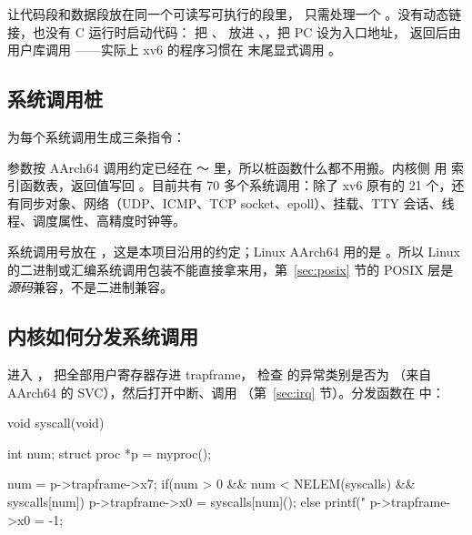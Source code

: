  让代码段和数据段放在同一个可读写可执行的段里， 只需处理一个 。没有动态链接，也没有 C 运行时启动代码： 把 、 放进 、，把 PC 设为入口地址， 返回后由用户库调用 ——实际上 xv6 的程序习惯在  末尾显式调用 。

\subsection{系统调用桩}

 为每个系统调用生成三条指令：


参数按 AArch64 调用约定已经在 ～ 里，所以桩函数什么都不用搬。内核侧  用  索引函数表，返回值写回 。目前共有 70 多个系统调用：除了 xv6 原有的 21 个，还有同步对象、网络（UDP、ICMP、TCP socket、epoll）、挂载、TTY 会话、线程、调度属性、高精度时钟等。

\begin{note}
  系统调用号放在 ，这是本项目沿用的约定；Linux AArch64 用的是 。所以 Linux 的二进制或汇编系统调用包装不能直接拿来用，第~\ref{sec:posix} 节的 POSIX 层是\emph{源码}兼容，不是二进制兼容。
\end{note}

\subsection{内核如何分发系统调用}
\label{sec:syscall-dispatch}

 进入 ， 把全部用户寄存器存进 trapframe， 检查  的异常类别是否为 （来自 AArch64 的 SVC），然后打开中断、调用 （第~\ref{sec:irq} 节）。分发函数在  中：

\begin{ccode}
void syscall(void)
{
  int num;
  struct proc *p = myproc();

  num = p->trapframe->x7;
  if(num > 0 && num < NELEM(syscalls) && syscalls[num]) {
    p->trapframe->x0 = syscalls[num]();
  } else {
    printf("%
    p->trapframe->x0 = -1;
  }
}
\end{ccode}

